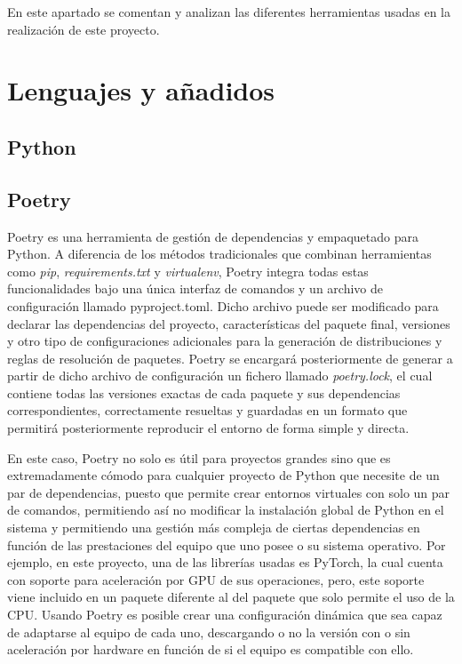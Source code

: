 
En este apartado se comentan y analizan las diferentes herramientas usadas en la realización de este proyecto.

\section{Lenguajes y añadidos}

\subsection{Python}

\subsection{Poetry}

Poetry es una herramienta de gestión de dependencias y empaquetado para Python. A diferencia de los métodos tradicionales que combinan herramientas como \textit{pip}, \textit{requirements.txt} y \textit{virtualenv}, Poetry integra todas estas funcionalidades bajo una única interfaz de comandos y un archivo de configuración llamado pyproject.toml. Dicho archivo puede ser modificado para declarar las dependencias del proyecto, características del paquete final, versiones y otro tipo de configuraciones adicionales para la generación de distribuciones y reglas de resolución de paquetes. Poetry se encargará posteriormente de generar a partir de dicho archivo de configuración un fichero llamado \textit{poetry.lock}, el cual contiene todas las versiones exactas de cada paquete y sus dependencias correspondientes, correctamente resueltas y guardadas en un formato que permitirá posteriormente reproducir el entorno de forma simple y directa.

En este caso, Poetry no solo es útil para proyectos grandes sino que es extremadamente cómodo para cualquier proyecto de Python que necesite de un par de dependencias, puesto que permite crear entornos virtuales con solo un par de comandos, permitiendo así no modificar la instalación global de Python en el sistema y permitiendo una gestión más compleja de ciertas dependencias en función de las prestaciones del equipo que uno posee o su sistema operativo. Por ejemplo, en este proyecto, una de las librerías usadas es PyTorch, la cual cuenta con soporte para aceleración por GPU de sus operaciones, pero, este soporte viene incluido en un paquete diferente al del paquete que solo permite el uso de la CPU. Usando Poetry es posible crear una configuración dinámica que sea capaz de adaptarse al equipo de cada uno, descargando o no la versión con o sin aceleración por hardware en función de si el equipo es compatible con ello.

